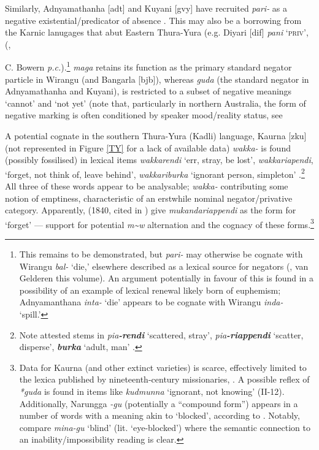  Similarly, Adnyamathanha [\gls{adt}] and Kuyani [\gls{gvy}] have recruited \textit{pari-} as a negative existential/predicator of absence \citep[141]{Hercus1999}. This may also be a borrowing from the Karnic lanugages that abut Eastern Thura-Yura (e.g. Diyari [\gls{dif}] \textit{pani} \textsc{`priv'}, (\citealt{Austin2011}, {C. Bowern \textit{p.c.}).\footnote{This remains to be demonstrated, but \textit{pari-} may otherwise be cognate with Wirangu \textit{bal-} `die,' elsewhere described as a lexical source for negators (\citealt{Veselinova2013}, van Gelderen this volume). An argument potentially in favour of this is found in a possibility of an example of lexical renewal likely born of euphemism; Adnyamanthana \textit{inta-} `die' appears to be cognate with Wirangu \textit{inda-} `spill.'}
\textit{maga} retains its function as the primary standard negator particle in Wirangu (and Bangarla [\gls{bjb}]),  whereas \textit{guda} (the standard negator in Adnyamathanha and Kuyani), is restricted to a subset of negative meanings `cannot' and `not yet' (note that, particularly in northern Australia, the form of negative marking is often conditioned by speaker mood/reality status, see 

A potential cognate in the southern Thura-Yura (Kadli) language, Kaurna [\gls{zku}] (not represented in Figure \ref{TY} for a lack of available data) \textit{wakka-} is found (possibly fossilised) in lexical items \textit{wakkarendi} `err, stray, be lost', \textit{wakkariapendi}, `forget, not think of, leave behind', \textit{wakkariburka} `ignorant person, simpleton' \citep[II-52]{Schurmann1840}.\footnote{Note attested stems in \textit{pia\textbf{-rendi}} `scattered, stray', \textit{pia\textbf{-riappendi}} `scatter, disperse', \textit{\textbf{burka}} `adult, man' \citep[II-4,38]{Schurmann1840}.} All three of these words appear to be analysable; \textit{wakka-} contributing some notion of emptiness, characteristic of an erstwhile nominal negator/privative category. Apparently, \citeauthor{Teichelmann1840} (1840, cited in \citealt{Amery1996a}) give \textit{mukandariappendi} as the form for `forget' --- support for potential \textit{m\textasciitilde{w}} alternation and the cognacy of these forms.\footnote{Data for Kaurna (and other extinct varieties) is scarce, effectively limited to the lexica published by nineteenth-century missionaries, \citet{Schurmann1840}. A possible reflex of \textit{*guda} is found in items like \textit{kudmunna} `ignorant, not knowing' (II-12). Additionally, Narungga \textit{-gu} (potentially a ``compound form'') appears in a number of words with a meaning akin to `blocked', according to \citet[82]{Eira2010}. Notably, compare \textit{mina-gu} `blind' (lit. `eye-blocked') where the semantic connection to an inability/impossibility reading is clear.
	
}}
